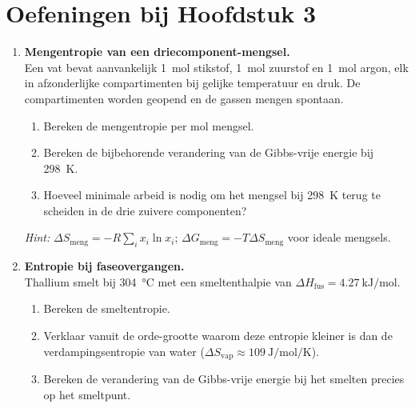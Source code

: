 
\section*{Oefeningen bij Hoofdstuk 3}


\begin{enumerate}

\item \textbf{Mengentropie van een driecomponent-mengsel.} \\
Een vat bevat aanvankelijk \SI{1}{\mole} stikstof, \SI{1}{\mole} zuurstof en \SI{1}{\mole} argon, elk in afzonderlijke compartimenten bij gelijke temperatuur en druk. De compartimenten worden geopend en de gassen mengen spontaan.
\begin{enumerate}
\item[(a)] Bereken de mengentropie per mol mengsel.
\item[(b)] Bereken de bijbehorende verandering van de Gibbs-vrije energie bij \SI{298}{\kelvin}.
\item[(c)] Hoeveel minimale arbeid is nodig om het mengsel bij \SI{298}{\kelvin} terug te scheiden in de drie zuivere componenten?
\end{enumerate}
\emph{Hint:} $\Delta S_{\text{meng}} = -R\sum_i x_i \ln x_i$; $\Delta G_{\text{meng}} = -T \Delta S_{\text{meng}}$ voor ideale mengsels.

\item \textbf{Entropie bij faseovergangen.} \\
Thallium smelt bij \SI{304}{\celsius} met een smeltenthalpie van $\Delta H_{\text{fus}} = \SI{4.27}{\kilo\joule\per\mole}$.
\begin{enumerate}
\item[(a)] Bereken de smeltentropie.
\item[(b)] Verklaar vanuit de orde-grootte waarom deze entropie kleiner is dan de verdampingsentropie van water ($\Delta S_{\text{vap}} \approx \SI{109}{\joule\per\mole\per\kelvin}$).
\item[(c)] Bereken de verandering van de Gibbs-vrije energie bij het smelten precies op het smeltpunt.
\end{enumerate}


\end{enumerate}

